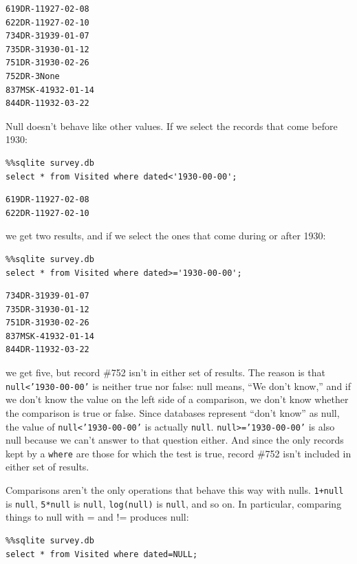 \documentclass{book}
\begin{document}
\begin{verbatim}
619DR-11927-02-08
622DR-11927-02-10
734DR-31939-01-07
735DR-31930-01-12
751DR-31930-02-26
752DR-3None
837MSK-41932-01-14
844DR-11932-03-22
\end{verbatim}

Null doesn't behave like other values. If we select the records that
come before 1930:

\begin{verbatim}
%%sqlite survey.db
select * from Visited where dated<'1930-00-00';
\end{verbatim}

\begin{verbatim}
619DR-11927-02-08
622DR-11927-02-10
\end{verbatim}

we get two results, and if we select the ones that come during or after
1930:

\begin{verbatim}
%%sqlite survey.db
select * from Visited where dated>='1930-00-00';
\end{verbatim}

\begin{verbatim}
734DR-31939-01-07
735DR-31930-01-12
751DR-31930-02-26
837MSK-41932-01-14
844DR-11932-03-22
\end{verbatim}

we get five, but record \#752 isn't in either set of results. The reason
is that \texttt{null\textless{}'1930-00-00'} is neither true nor false:
null means, ``We don't know,'' and if we don't know the value on the
left side of a comparison, we don't know whether the comparison is true
or false. Since databases represent ``don't know'' as null, the value of
\texttt{null\textless{}'1930-00-00'} is actually \texttt{null}.
\texttt{null\textgreater{}='1930-00-00'} is also null because we can't
answer to that question either. And since the only records kept by a
\texttt{where} are those for which the test is true, record \#752 isn't
included in either set of results.

Comparisons aren't the only operations that behave this way with nulls.
\texttt{1+null} is \texttt{null}, \texttt{5*null} is \texttt{null},
\texttt{log(null)} is \texttt{null}, and so on. In particular, comparing
things to null with = and != produces null:

\begin{verbatim}
%%sqlite survey.db
select * from Visited where dated=NULL;
\end{verbatim}
\end{document}
